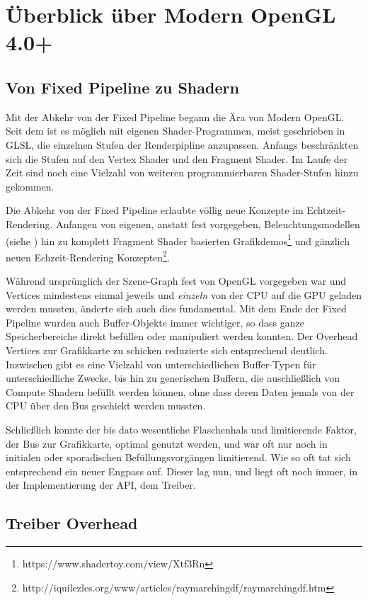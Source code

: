 \chapter{Überblick über Modern OpenGL 4.0+}
\label{cha:modern-opengl}

\section{Von Fixed Pipeline zu Shadern}
Mit der Abkehr von der Fixed Pipeline begann die Ära von Modern OpenGL. Seit dem ist es möglich mit eigenen Shader-Programmen, meist geschrieben in GLSL, die einzelnen Stufen der Renderpipline anzupassen. Anfangs beschränkten sich die Stufen auf den Vertex Shader und den Fragment Shader. Im Laufe der Zeit sind noch eine Vielzahl von weiteren programmierbaren Shader-Stufen hinzu gekommen.

Die Abkehr von der Fixed Pipeline erlaubte völlig neue Konzepte im Echtzeit-Rendering. Anfangen von eigenen, anstatt fest vorgegeben, Beleuchtungsmodellen (siehe ) hin zu komplett Fragment Shader basierten Grafikdemos\footnote{https://www.shadertoy.com/view/Xtf3Rn} und gänzlich neuen Echzeit-Rendering Konzepten\footnote{http://iquilezles.org/www/articles/raymarchingdf/raymarchingdf.htm}.

Während ursprünglich der Szene-Graph fest von OpenGL vorgegeben war und Vertices mindestens einmal jeweils und \textit{einzeln} von der CPU auf die GPU geladen werden mussten, änderte sich auch dies fundamental. Mit dem Ende der Fixed Pipeline wurden auch Buffer-Objekte immer wichtiger, so dass ganze Speicherbereiche direkt befüllen oder manipuliert werden konnten. Der Overhead Vertices zur Grafikkarte zu schicken reduzierte sich entsprechend deutlich. Inzwischen gibt es eine Vielzahl von unterschiedlichen Buffer-Typen für unterschiedliche Zwecke, bis hin zu generischen Buffern, die auschließlich von Compute Shadern befüllt werden können, ohne dass deren Daten jemals von der CPU über den Bus geschickt werden mussten.

Schließlich konnte der bis dato wesentliche Flaschenhals und limitierende Faktor, der Bus zur Grafikkarte, optimal genutzt werden, und war oft nur noch in initialen oder sporadischen Befüllungsvorgängen limitierend. Wie so oft tat sich entsprechend ein neuer Engpass auf. Dieser lag nun, und liegt oft noch immer, in der Implementierung der API, dem Treiber.

\section{Treiber Overhead}

